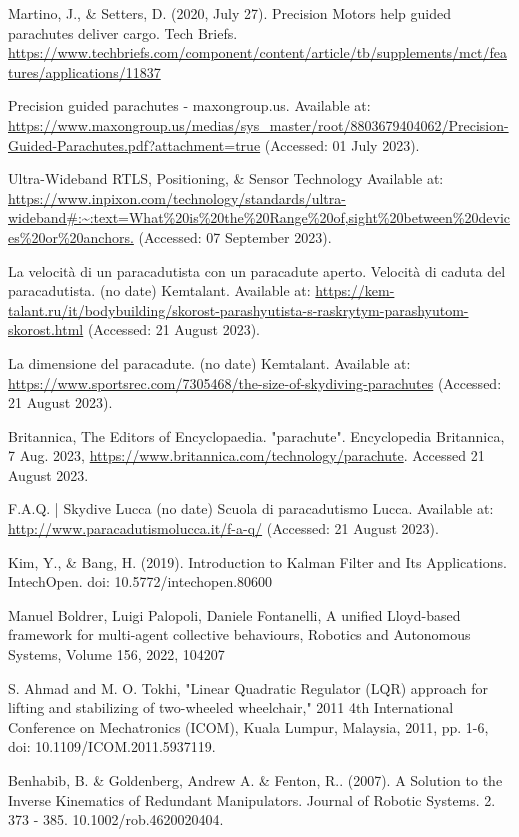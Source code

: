 \begin{thebibliography}{00}
 Martino, J., \& Setters, D. (2020, July 27). Precision Motors help guided parachutes deliver cargo. Tech Briefs. \url{https://www.techbriefs.com/component/content/article/tb/supplements/mct/features/applications/11837}

 Precision guided parachutes - maxongroup.us. Available at: \url{https://www.maxongroup.us/medias/sys_master/root/8803679404062/Precision-Guided-Parachutes.pdf?attachment=true} (Accessed: 01 July 2023).

 Ultra-Wideband RTLS, Positioning, \& Sensor Technology Available at: \url{https://www.inpixon.com/technology/standards/ultra-wideband#:~:text=What%20is%20the%20Range%20of,sight%20between%20devices%20or%20anchors.} (Accessed: 07 September 2023). 

 La velocità di un paracadutista con un paracadute aperto. Velocità di caduta del paracadutista. (no date) Kemtalant. Available at: \url{https://kem-talant.ru/it/bodybuilding/skorost-parashyutista-s-raskrytym-parashyutom-skorost.html} (Accessed: 21 August 2023). 

 La dimensione del paracadute. (no date) Kemtalant. Available at: \url{https://www.sportsrec.com/7305468/the-size-of-skydiving-parachutes} (Accessed: 21 August 2023). 

 Britannica, The Editors of Encyclopaedia. "parachute". Encyclopedia Britannica, 7 Aug. 2023, \url{https://www.britannica.com/technology/parachute}. Accessed 21 August 2023.

 F.A.Q. | Skydive Lucca (no date) Scuola di paracadutismo Lucca. Available at: \url{http://www.paracadutismolucca.it/f-a-q/} (Accessed: 21 August 2023). 

 Kim, Y., \& Bang, H. (2019). Introduction to Kalman Filter and Its Applications. IntechOpen. doi: 10.5772/intechopen.80600

 Manuel Boldrer, Luigi Palopoli, Daniele Fontanelli,
A unified Lloyd-based framework for multi-agent collective behaviours,
Robotics and Autonomous Systems,
Volume 156,
2022,
104207

 S. Ahmad and M. O. Tokhi, "Linear Quadratic Regulator (LQR) approach for lifting and stabilizing of two-wheeled wheelchair," 2011 4th International Conference on Mechatronics (ICOM), Kuala Lumpur, Malaysia, 2011, pp. 1-6, doi: 10.1109/ICOM.2011.5937119.

 Benhabib, B. \& Goldenberg, Andrew A. \& Fenton, R.. (2007). A Solution to the Inverse Kinematics of Redundant Manipulators. Journal of Robotic Systems. 2. 373 - 385. 10.1002/rob.4620020404. 


\end{thebibliography}
